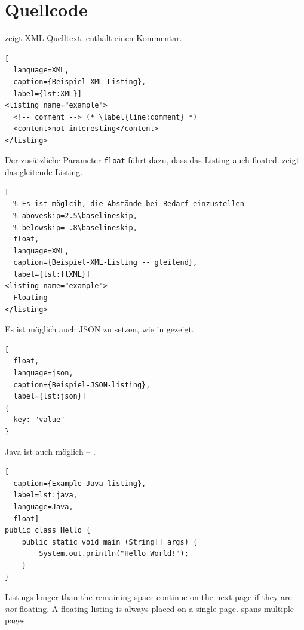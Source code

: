 \section{Quellcode}

\begin{ltgexample}
 zeigt XML-Quelltext.
 enthält einen Kommentar.

\begin{lstlisting}[
  language=XML,
  caption={Beispiel-XML-Listing},
  label={lst:XML}]
<listing name="example">
  <!-- comment --> (* \label{line:comment} *)
  <content>not interesting</content>
</listing>
\end{lstlisting}
\end{ltgexample}

Der zusätzliche Parameter \verb+float+ führt dazu, dass das Listing auch floated.
 zeigt das gleitende Listing.

\begin{ltgexample}
\begin{lstlisting}[
  % Es ist möglcih, die Abstände bei Bedarf einzustellen
  % aboveskip=2.5\baselineskip,
  % belowskip=-.8\baselineskip,
  float,
  language=XML,
  caption={Beispiel-XML-Listing -- gleitend},
  label={lst:flXML}]
<listing name="example">
  Floating
</listing>
\end{lstlisting}
\end{ltgexample}

Es ist möglich auch JSON zu setzen, wie in  gezeigt.

\begin{ltgexample}
\begin{lstlisting}[
  float,
  language=json,
  caption={Beispiel-JSON-listing},
  label={lst:json}]
{
  key: "value"
}
\end{lstlisting}
\end{ltgexample}

Java ist auch möglich -- .

\begin{ltgexample}
\begin{lstlisting}[
  caption={Example Java listing},
  label=lst:java,
  language=Java,
  float]
public class Hello {
    public static void main (String[] args) {
        System.out.println("Hello World!");
    }
}
\end{lstlisting}
\end{ltgexample}

Listings longer than the remaining space continue on the next page if they are \emph{not} floating.
A floating listing is always placed on a single page.
 spans multiple pages.

